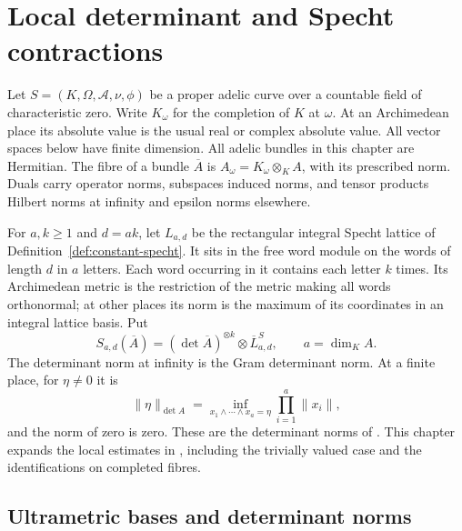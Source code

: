 \chapter{Local determinant and Specht contractions}

Let $S=(K,\Omega,\mathcal A,\nu,\phi)$ be a proper adelic curve over a
countable field of characteristic zero. Write $K_\omega$ for the completion
of $K$ at $\omega$. At an Archimedean place its absolute value is the usual
real or complex absolute value. All vector spaces below have finite dimension.
All adelic bundles in this chapter are Hermitian.
The fibre of a bundle $\overline A$ is $A_\omega=K_\omega\otimes_K A$,
with its prescribed norm. Duals carry operator norms, subspaces induced norms,
and tensor products Hilbert norms at infinity and epsilon norms elsewhere.

For $a,k\geq1$ and $d=ak$, let $L_{a,d}$ be the rectangular integral Specht
lattice of Definition~\ref{def:constant-specht}. It sits in the free word
module on the words of length $d$ in $a$ letters. Each word occurring in it
contains each letter $k$ times. Its Archimedean metric is the restriction of
the metric making all words orthonormal; at other places its norm is the
maximum of its coordinates in an integral lattice basis. Put
\[
 S_{a,d}(\overline A)=(\det\overline A)^{\otimes k}
                   \otimes\overline L^S_{a,d},\qquad a=\dim_K A.
\]
The determinant norm at infinity is the Gram determinant norm. At a finite
place, for $\eta\neq0$ it is
\[
 \|\eta\|_{\det A}=\inf_{x_1\wedge\cdots\wedge x_a=\eta}
                         \prod_{i=1}^a\|x_i\|,
\]
and the norm of zero is zero. These are the determinant norms of
\cite[Section 2.3]{bost2026}. This chapter expands the local estimates in
\cite[Lemma 6.1 and the proof of Theorem 6.2]{bost2026}, including the
trivially valued case and the identifications on completed fibres.

\section{Ultrametric bases and determinant norms}

